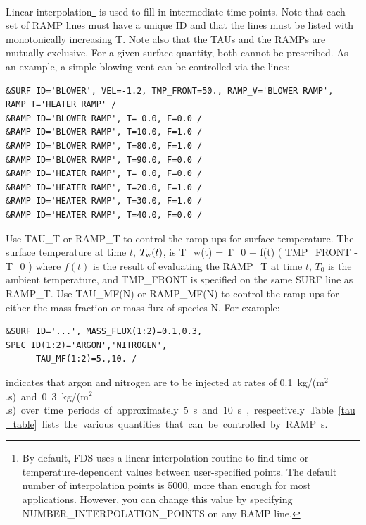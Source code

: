 \documentclass[11pt]{book}
\begin{document}
Linear interpolation\footnote{By default, FDS uses a linear interpolation routine to find time or temperature-dependent values between user-specified points.
The default number of interpolation points is 5000, more than enough for most applications. However, you can change this value
by specifying {\ct NUMBER\_INTERPOLATION\_POINTS} on any {\ct RAMP} line.} is used to fill in intermediate time points.
Note that each set of {\ct RAMP} lines must have a unique {\ct ID} and that the lines must
be listed with monotonically increasing {\ct T}.
Note also that the {\ct TAU}s and the {\ct RAMP}s are mutually exclusive. For a given
surface quantity, both cannot be prescribed.
As an example, a simple blowing vent can be controlled via the lines:
\begin{lstlisting}
&SURF ID='BLOWER', VEL=-1.2, TMP_FRONT=50., RAMP_V='BLOWER RAMP', RAMP_T='HEATER RAMP' /
&RAMP ID='BLOWER RAMP', T= 0.0, F=0.0 /
&RAMP ID='BLOWER RAMP', T=10.0, F=1.0 /
&RAMP ID='BLOWER RAMP', T=80.0, F=1.0 /
&RAMP ID='BLOWER RAMP', T=90.0, F=0.0 /
&RAMP ID='HEATER RAMP', T= 0.0, F=0.0 /
&RAMP ID='HEATER RAMP', T=20.0, F=1.0 /
&RAMP ID='HEATER RAMP', T=30.0, F=1.0 /
&RAMP ID='HEATER RAMP', T=40.0, F=0.0 /
\end{lstlisting}
Use {\ct TAU\_T} or {\ct RAMP\_T} to control the ramp-ups for surface temperature. The surface temperature at time $t$, $T_{\rm w}(t)$, is
\be
   T_{\rm w}(t) = T_0 + f(t) \left( {\ct TMP\_FRONT} - T_0 \right)
\ee
where $f(t)$ is the result of evaluating the {\ct RAMP\_T} at time $t$, $T_0$ is the ambient temperature, and {\ct TMP\_FRONT} is specified on the same {\ct SURF} line as {\ct RAMP\_T}. Use {\ct TAU\_MF(N)} or {\ct RAMP\_MF(N)} to control the ramp-ups for either the mass fraction or mass flux of species {\ct N}. For example:
\begin{lstlisting}
&SURF ID='...', MASS_FLUX(1:2)=0.1,0.3, SPEC_ID(1:2)='ARGON','NITROGEN',
      TAU_MF(1:2)=5.,10. /
\end{lstlisting}
indicates that argon and nitrogen are to be injected at rates of 0.1~\si{kg/(m$^2$.s)} and 0.3~\si{kg/(m$^2$.s)} over time periods of approximately 5~s and 10~s, respectively.

Table~\ref{tau_table} lists the various quantities that can be controlled by {\ct RAMP}s.
\end{document}
